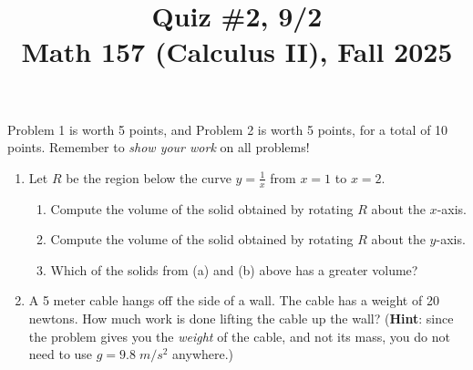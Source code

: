 \documentclass[11pt]{article}
\title{Quiz \#2, 9/2 \\ Math 157 (Calculus II), Fall 2025}
\date{}
\begin{document}
\maketitle

\thispagestyle{empty}

\vspace{-2cm}

Problem 1 is worth 5 points, and Problem 2 is worth 5 points, for a total of 10 points. Remember to \emph{show your work} on all problems!

\begin{enumerate}
\item Let $R$ be the region below the curve $y=\frac{1}{x}$ from $x=1$ to $x=2$.
\begin{enumerate}
\item Compute the volume of the solid obtained by rotating $R$ about the $x$-axis.
\item Compute the volume of the solid obtained by rotating $R$ about the $y$-axis.
\item Which of the solids from (a) and (b) above has a greater volume?
\end{enumerate}

\vspace{8cm}

\item A 5 meter cable hangs off the side of a wall. The cable has a weight of 20 newtons. How much work is done lifting the cable up the wall? ({\bf Hint}: since the problem gives you the \emph{weight} of the cable, and not its mass, you do not need to use $g=9.8 \; m/s^2$ anywhere.)

\end{enumerate}
\end{document}
